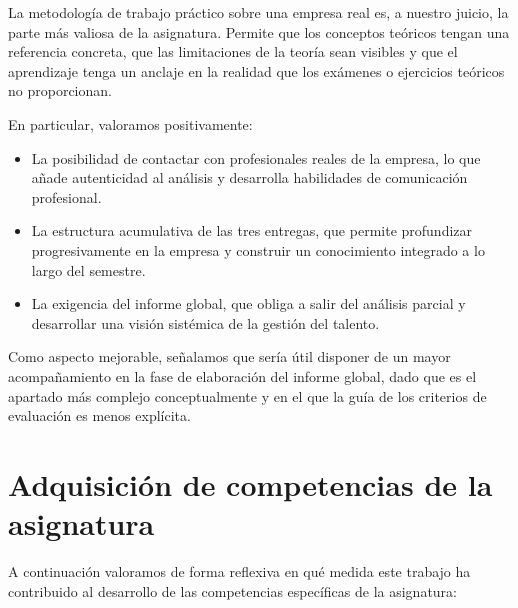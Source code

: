 La metodología de trabajo práctico sobre una empresa real es, a nuestro
juicio, la parte más valiosa de la asignatura. Permite que los conceptos
teóricos tengan una referencia concreta, que las limitaciones de la teoría
sean visibles y que el aprendizaje tenga un anclaje en la realidad que
los exámenes o ejercicios teóricos no proporcionan.

En particular, valoramos positivamente:

\begin{itemize}
  \item La posibilidad de contactar con profesionales reales de la empresa,
        lo que añade autenticidad al análisis y desarrolla habilidades de
        comunicación profesional.
  \item La estructura acumulativa de las tres entregas, que permite
        profundizar progresivamente en la empresa y construir un conocimiento
        integrado a lo largo del semestre.
  \item La exigencia del informe global, que obliga a salir del análisis
        parcial y desarrollar una visión sistémica de la gestión del talento.
\end{itemize}

Como aspecto mejorable, señalamos que sería útil disponer de un mayor
acompañamiento en la fase de elaboración del informe global, dado que es
el apartado más complejo conceptualmente y en el que la guía de los criterios
de evaluación es menos explícita.

\section{Adquisición de competencias de la asignatura}

A continuación valoramos de forma reflexiva en qué medida este trabajo
ha contribuido al desarrollo de las competencias específicas de la asignatura:


